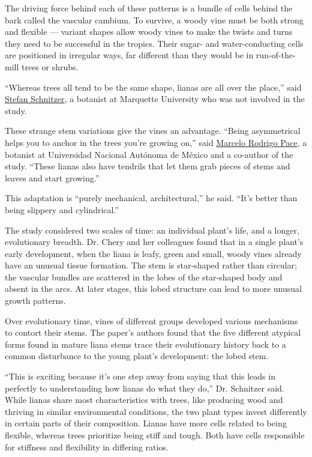 The driving force behind each of these patterns is a bundle of cells
behind the bark called the vascular cambium. To survive, a woody vine
must be both strong and flexible --- variant shapes allow woody vines to
make the twists and turns they need to be successful in the tropics.
Their sugar- and water-conducting cells are positioned in irregular
ways, far different than they would be in run-of-the-mill trees or
shrubs.

``Whereas trees all tend to be the same shape, lianas are all over the
place,'' said
\href{https://www.marquette.edu/biology/directory/schnitzer.php}{Stefan
Schnitzer}, a botanist at Marquette University who was not involved in
the study.

These strange stem variations give the vines an advantage. ``Being
asymmetrical helps you to anchor in the trees you're growing on,'' said
\href{http://www.ib.unam.mx/directorio/234}{Marcelo Rodrigo Pace}, a
botanist at Universidad Nacional Autónoma de México and a co-author of
the study. ``These lianas also have tendrils that let them grab pieces
of stems and leaves and start growing.''

This adaptation is ``purely mechanical, architectural,'' he said. ``It's
better than being slippery and cylindrical.''

The study considered two scales of time: an individual plant's life, and
a longer, evolutionary breadth. Dr. Chery and her colleagues found that
in a single plant's early development, when the liana is leafy, green
and small, woody vines already have an unusual tissue formation. The
stem is star-shaped rather than circular; the vascular bundles are
scattered in the lobes of the star-shaped body and absent in the arcs.
At later stages, this lobed structure can lead to more unusual growth
patterns.

Over evolutionary time, vines of different groups developed various
mechanisms to contort their stems. The paper's authors found that the
five different atypical forms found in mature liana stems trace their
evolutionary history back to a common disturbance to the young plant's
development: the lobed stem.

``This is exciting because it's one step away from saying that this
leads in perfectly to understanding how lianas do what they do,'' Dr.
Schnitzer said. While lianas share most characteristics with trees, like
producing wood and thriving in similar environmental conditions, the two
plant types invest differently in certain parts of their composition.
Lianas have more cells related to being flexible, whereas trees
prioritize being stiff and tough. Both have cells responsible for
stiffness and flexibility in differing ratios.

